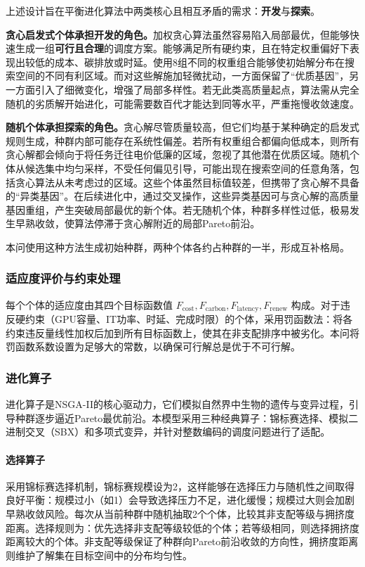 \documentclass[UTF8,a4paper,zihao=-4]{ctexart}
\begin{document}
上述设计旨在平衡进化算法中两类核心且相互矛盾的需求：\textbf{开发}与\textbf{探索}。

\textbf{贪心启发式个体承担开发的角色。}加权贪心算法虽然容易陷入局部最优，但能够快速生成一组\textbf{可行且合理}的调度方案。能够满足所有硬约束，且在特定权重偏好下表现出较低的成本、碳排放或时延。使用8组不同的权重组合能够使初始解分布在搜索空间的不同有利区域。而对这些解施加轻微扰动，一方面保留了“优质基因”，另一方面引入了细微变化，增强了局部多样性。若无此类高质量起点，算法需从完全随机的劣质解开始进化，可能需要数百代才能达到同等水平，严重拖慢收敛速度。

\textbf{随机个体承担探索的角色。}贪心解尽管质量较高，但它们均基于某种确定的启发式规则生成，种群内部可能存在系统性偏差。若所有权重组合都偏向低成本，则所有贪心解都会倾向于将任务迁往电价低廉的区域，忽视了其他潜在优质区域。随机个体从候选集中均匀采样，不受任何偏见引导，可能出现在搜索空间的任意角落，包括贪心算法从未考虑过的区域。这些个体虽然目标值较差，但携带了贪心解不具备的“异类基因”。在后续进化中，通过交叉操作，这些异类基因可与贪心解的高质量基因重组，产生突破局部最优的新个体。若无随机个体，种群多样性过低，极易发生早熟收敛，使算法停滞于贪心解附近的局部Pareto前沿。

本问使用这种方法生成初始种群，两种个体各约占种群的一半，形成互补格局。



\subsubsection{适应度评价与约束处理}

每个个体的适应度由其四个目标函数值 $F_{\text{cost}}, F_{\text{carbon}}, F_{\text{latency}}, F_{\text{renew}}$ 构成。对于违反硬约束（GPU容量、IT功率、时延、完成时限）的个体，采用罚函数法：将各约束违反量线性加权后加到所有目标函数上，使其在非支配排序中被劣化。本问将罚函数系数设置为足够大的常数，以确保可行解总是优于不可行解。

\subsubsection{进化算子}

进化算子是NSGA-II的核心驱动力，它们模拟自然界中生物的遗传与变异过程，引导种群逐步逼近Pareto最优前沿。本模型采用三种经典算子：锦标赛选择、模拟二进制交叉（SBX）和多项式变异，并针对整数编码的调度问题进行了适配。

\paragraph{选择算子}
采用锦标赛选择机制，锦标赛规模设为2，这样能够在选择压力与随机性之间取得良好平衡：规模过小（如1）会导致选择压力不足，进化缓慢；规模过大则会加剧早熟收敛风险。每次从当前种群中随机抽取2个个体，比较其非支配等级与拥挤度距离。选择规则为：优先选择非支配等级较低的个体；若等级相同，则选择拥挤度距离较大的个体。非支配等级保证了种群向Pareto前沿收敛的方向性，拥挤度距离则维护了解集在目标空间中的分布均匀性。
\end{document}
